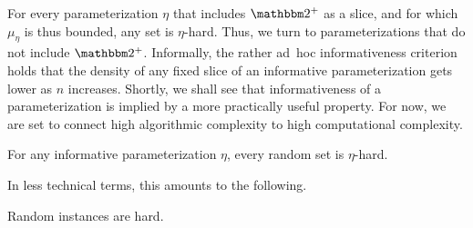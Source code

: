 For every parameterization $\eta$ that includes $\binary^+$ as a slice, and for which $\mu_\eta$ is thus bounded, any set is $\eta$-hard.
Thus, we turn to parameterizations that do not include $\binary^+$.
Informally, the rather ad~hoc informativeness criterion holds that the density of any fixed slice of an informative parameterization gets lower as $n$ increases.
Shortly, we shall see that informativeness of a parameterization is implied by a more practically useful property.
For now, we are set to connect high algorithmic complexity to high computational complexity.
\begin{theorem}
\label{thm:randomhard}
  For any informative parameterization $\eta$, every random set is $\eta$-hard.
\end{theorem}
In less technical terms, this amounts to the following.
\begin{slogan}
  Random instances are hard.
\end{slogan}
